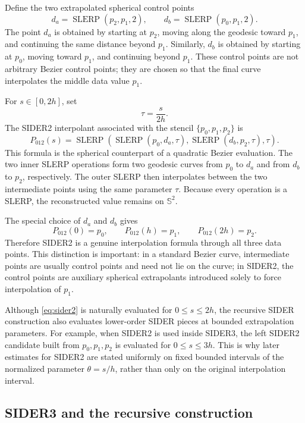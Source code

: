 \documentclass[a4paper,11pt]{article}
\newcommand{\bS}{\mathbb{S}}
\newcommand{\SLERP}{\operatorname{SLERP}}
\numberwithin{equation}{section}
\begin{document}
Define the two extrapolated spherical control points
\begin{equation}
\label{eq:sider2_controls}
        d_a=\SLERP(p_2,p_1,2),
        \qquad
        d_b=\SLERP(p_0,p_1,2).
\end{equation}
The point \(d_a\) is obtained by starting at \(p_2\), moving along the geodesic
toward \(p_1\), and continuing the same distance beyond \(p_1\).  Similarly,
\(d_b\) is obtained by starting at \(p_0\), moving toward \(p_1\), and
continuing beyond \(p_1\).  These control points are not arbitrary Bezier
control points; they are chosen so that the final curve interpolates the
middle data value \(p_1\).

For \(s\in[0,2h]\), set
\[
        \tau=\frac{s}{2h}.
\]
The SIDER2 interpolant associated with the stencil
\(\{p_0,p_1,p_2\}\) is
\begin{equation}
\label{eq:sider2}
P_{012}(s)
=
\SLERP\left(
        \SLERP(p_0,d_a,\tau),
        \SLERP(d_b,p_2,\tau),
        \tau
       \right).
\end{equation}
This formula is the spherical counterpart of a quadratic Bezier evaluation.
The two inner SLERP operations form two geodesic curves from \(p_0\) to
\(d_a\) and from \(d_b\) to \(p_2\), respectively.  The outer SLERP then
interpolates between the two intermediate points using the same parameter
\(\tau\).  Because every operation is a SLERP, the reconstructed value remains
on \(\bS^2\).

The special choice of \(d_a\) and \(d_b\) gives
\[
        P_{012}(0)=p_0,\qquad
        P_{012}(h)=p_1,\qquad
        P_{012}(2h)=p_2 .
\]
Therefore SIDER2 is a genuine interpolation formula through all three data
points.  This distinction is important: in a standard Bezier curve, intermediate
points are usually control points and need not lie on the curve; in SIDER2, the
control points are auxiliary spherical extrapolants introduced solely to force
interpolation of \(p_1\).

Although \eqref{eq:sider2} is naturally evaluated for \(0\leq s\leq2h\), the
recursive SIDER construction also evaluates lower-order SIDER pieces at
bounded extrapolation parameters.  For example, when SIDER2 is used inside
SIDER3, the left SIDER2 candidate built from \(p_0,p_1,p_2\) is evaluated for
\(0\leq s\leq3h\).  This is why later estimates for SIDER2 are stated
uniformly on fixed bounded intervals of the normalized parameter
\(\theta=s/h\), rather than only on the original interpolation interval.

\subsection{SIDER3 and the recursive construction}
\end{document}
